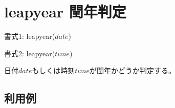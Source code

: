 
%

\section{leapyear 閏年判定\label{sect:leapyear}}

書式1: leapyear($date$)

書式2: leapyear($time$)

日付$date$もしくは時刻$time$が閏年かどうか判定する。

\subsection*{利用例}


%

